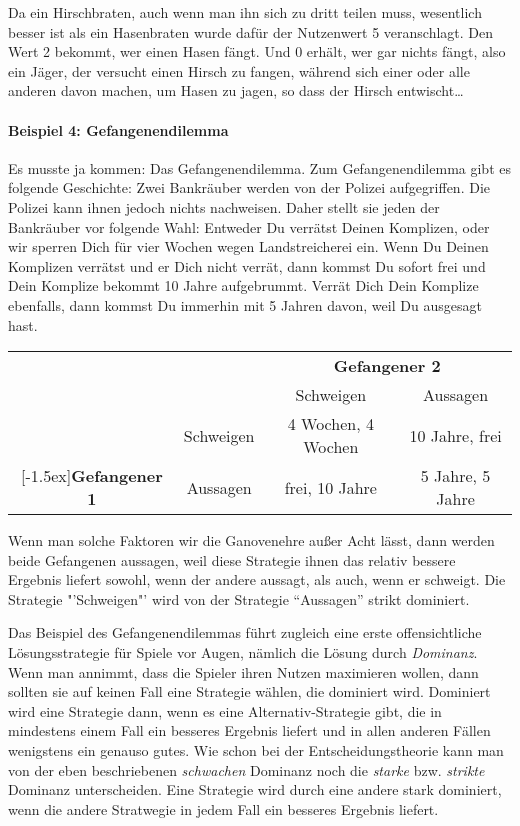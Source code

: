 Da ein Hirschbraten, auch wenn man ihn sich zu dritt teilen muss, wesentlich
besser ist als ein Hasenbraten wurde dafür der Nutzenwert 5 veranschlagt. Den
Wert 2 bekommt, wer einen Hasen fängt. Und 0 erhält, wer gar nichts fängt, also
ein Jäger, der versucht einen Hirsch zu fangen, während sich einer oder alle
anderen davon machen, um Hasen zu jagen, so dass der Hirsch entwischt\ldots


\paragraph{Beispiel 4: Gefangenendilemma}
\label{Gefangenendilemma}

Es musste ja kommen: Das Gefangenendilemma. Zum Gefangenendilemma gibt es
folgende Geschichte: Zwei Bankräuber werden von der Polizei aufgegriffen. 
Die Polizei kann ihnen
jedoch nichts nachweisen. Daher stellt sie jeden der Bankräuber vor folgende
Wahl: Entweder Du verrätst Deinen Komplizen, oder wir sperren Dich für vier
Wochen wegen Landstreicherei ein. Wenn Du Deinen Komplizen verrätst und er Dich
nicht verrät, dann kommst Du sofort frei und Dein Komplize bekommt 10 Jahre
aufgebrummt. Verrät Dich Dein Komplize ebenfalls, dann kommst Du immerhin mit 5
Jahren davon, weil Du ausgesagt hast. 

\begin{center}
\begin{tabular}{cc|c|c|}
& \multicolumn{1}{c}{} & \multicolumn{2}{c}{\bf Gefangener 2} \\
& \multicolumn{1}{c}{} & \multicolumn{1}{c}{Schweigen} &
\multicolumn{1}{c}{Aussagen} \\ \cline{3-4} 
& Schweigen                 & 4 Wochen, 4 Wochen     & 10 Jahre, frei \\
\cline{3-4}
\raisebox{1.5ex}[-1.5ex]{{\bf Gefangener 1}} 
& Aussagen                  & frei, 10 Jahre         & 5 Jahre, 5 Jahre \\
\cline{3-4}
\end{tabular}
\end{center}

Wenn man solche Faktoren wir die Ganovenehre außer Acht lässt, dann werden
beide Gefangenen aussagen, weil diese Strategie ihnen das relativ bessere
Ergebnis liefert sowohl, wenn der andere aussagt, als auch, wenn er schweigt.
Die Strategie "'Schweigen"' wird von der Strategie "`Aussagen"' strikt
dominiert.

Das Beispiel des Gefangenendilemmas führt zugleich eine erste offensichtliche
Lösungsstrategie für Spiele vor Augen, nämlich die Lösung durch {\em Dominanz}. 
Wenn man annimmt,
dass die Spieler ihren Nutzen maximieren wollen, dann sollten sie auf keinen Fall
eine Strategie wählen, die dominiert wird. Dominiert wird eine Strategie dann,
wenn es eine Alternativ-Strategie gibt, die in mindestens einem Fall ein
besseres Ergebnis liefert und in allen anderen Fällen wenigstens ein genauso
gutes. Wie schon bei der Entscheidungstheorie
kann man von der eben beschriebenen {\em schwachen} Dominanz
noch die {\em starke} bzw. {\em strikte} Dominanz unterscheiden. Eine Strategie
wird durch eine andere stark dominiert, wenn die andere Stratwegie in jedem
Fall ein besseres Ergebnis liefert. 

